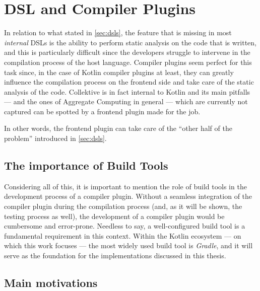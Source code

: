 \documentclass[12pt,a4paper,openright,twoside]{book}
\begin{document}
\section{DSL and Compiler Plugins}

In relation to what stated in \cref{sec:dsls}, the feature that is missing in
most \emph{internal} DSLs is the ability to perform static analysis on the code
that is written, and this is particularly difficult since the developers
struggle to intervene in the compilation process of the host language.
%
Compiler plugins seem perfect for this task since, in the case of Kotlin
compiler plugins at least, they can greatly influence the compilation process on
the frontend side and take care of the static analysis of the code. Collektive
is in fact internal to Kotlin and its main pitfalls --- and the ones of
Aggregate Computing in general --- which are currently not captured can be
spotted by a frontend plugin made for the job. 

In other words, the frontend plugin can take care of the ``other half of the 
problem'' introduced in \cref{sec:dsls}.

\subsection{The importance of Build Tools}

Considering all of this, it is important to mention the role of build tools in
the development process of a compiler plugin. Without a seamless integration of
the compiler plugin during the compilation process (and, as it will be shown,
the testing process as well), the development of a compiler plugin would be
cumbersome and error-prone. 
%
Needless to say, a well-configured build tool is a fundamental requirement in
this context. Within the Kotlin ecosystem --- on which this work focuses --- the
most widely used build tool is \emph{Gradle}, and it will serve as the
foundation for the implementations discussed in this thesis.

\subsection{Main motivations}
\end{document}
